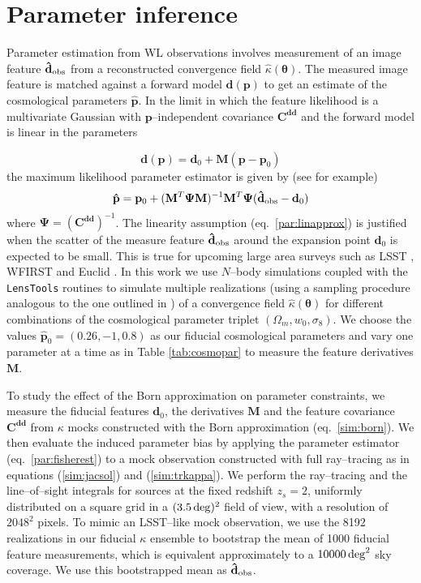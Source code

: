 \documentclass[reprint,aps,prd,superscriptaddress,showkeys,showpacs]{revtex4-1}
\newcommand{\bb}[1]{\mathbf{#1}}
\newcommand{\bbh}[1]{\mathbf{\hat{#1}}}
\newcommand{\h}[1]{\hat{#1}}
\newcommand{\ttt}[1]{\texttt{#1}}
\newcommand\pt{\pmb{\theta}}
\begin{document}

\section{Parameter inference}
\label{sec:params}
% 
Parameter estimation from WL observations involves measurement of an image feature $\bbh{d}_{\rm obs}$ from a reconstructed convergence field $\h{\kappa}(\pt)$. The measured image feature is matched against a forward model $\bb{d}(\bb{p})$ to get an estimate of the cosmological parameters $\bbh{p}$. In the limit in which the feature likelihood is a multivariate Gaussian with $\bb{p}$--independent covariance $\bb{C}^{\bb{d}\bb{d}}$ and the forward model is linear in the parameters 

\begin{equation}
\label{par:linapprox}
\bb{d}(\bb{p}) = \bb{d}_0 + \bb{M}(\bb{p}-\bb{p}_0)
\end{equation}
%
the maximum likelihood parameter estimator is given by (see \citep{DodelsonSchneider13,PetriVariance} for example)
\begin{equation}
\label{par:fisherest}
\bbh{p} = \bb{p}_0 + (\bb{M}^T\bb{\Psi M})^{-1} \bb{M}^T\bb{\Psi} (\bbh{d}_{\rm obs}-\bb{d}_0)
\end{equation}
%
where $\bb{\Psi}=(\bb{C}^{\bb{d}\bb{d}})^{-1}$. The linearity assumption (eq.~\ref{par:linapprox}) is justified when the scatter of the measure feature $\bbh{d}_{\rm obs}$ around the expansion point $\bb{d}_0$ is expected to be small. This is true for upcoming large area surveys such as LSST \citep{LSST}, WFIRST \citep{WFIRST} and Euclid \citep{Euclid}. In this work we use $N$--body simulations coupled with the \ttt{LensTools} routines to simulate multiple realizations (using a sampling procedure analogous to the one outlined in \citep{PetriVariance}) of a convergence field $\h{\kappa}(\pt)$ for different combinations of the cosmological parameter triplet $(\Omega_m,w_0,\sigma_8)$. We choose the values $\bbh{p}_0=(0.26,-1,0.8)$ as our fiducial cosmological parameters and vary one parameter at a time as in Table \ref{tab:cosmopar} to measure the feature derivatives $\bb{M}$. 

To study the effect of the Born approximation on parameter constraints, we measure the fiducial features $\bb{d}_0$, the derivatives $\bb{M}$ and the feature covariance $\bb{C}^{\bb{d}\bb{d}}$ from $\kappa$ mocks constructed with the Born approximation (eq.~\ref{sim:born}). We then evaluate the induced parameter bias by applying the parameter estimator (eq.~\ref{par:fisherest}) to a mock observation constructed with full ray--tracing as in equations (\ref{sim:jacsol}) and (\ref{sim:trkappa}). We perform the ray--tracing and the line--of--sight integrals for sources at the  fixed redshift $z_s=2$, uniformly distributed on a square grid in a $(3.5\,{\rm deg})^2$ field of view, with a resolution of $2048^2$ pixels. To mimic an LSST--like mock observation, we use the 8192 realizations in our fiducial $\kappa$ ensemble to bootstrap the mean of 1000 fiducial feature measurements, which is equivalent approximately to a $10000\,{\rm deg}^2$ sky coverage. We use this bootstrapped mean as $\bbh{d}_{\rm obs}$.   
\end{document}
